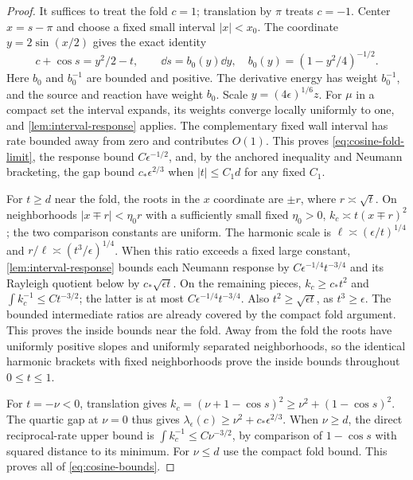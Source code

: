 \begin{proof}
It suffices to treat the fold $c=1$; translation by $\pi$ treats
$c=-1$. Center $x=s-\pi$ and choose a fixed small interval $|x|<x_0$.
The coordinate $y=2\sin(x/2)$ gives the exact identity
\[
 c+\cos s=y^2/2-t,\qquad
 \dd s=b_0(y)\dd y,\quad b_0(y)=(1-y^2/4)^{-1/2}.
\]
Here $b_0$ and $b_0^{-1}$ are bounded and positive. The derivative
energy has weight $b_0^{-1}$, and the source and reaction have weight
$b_0$. Scale $y=(4\epsilon)^{1/6}z$. For $\mu$ in a compact set the
interval expands, its weights converge locally uniformly to one,
and \cref{lem:interval-response} applies. The complementary fixed
wall interval has rate bounded away from zero and contributes $O(1)$.
This proves \eqref{eq:cosine-fold-limit}, the response bound
$C\epsilon^{-1/2}$, and, by the anchored inequality and Neumann
bracketing, the gap bound $c_*\epsilon^{2/3}$ when $|t|\le C_1d$
for any fixed $C_1$.

For $t\ge d$ near the fold, the roots in the $x$ coordinate are
$\pm r$, where $r\asymp\sqrt t$. On neighborhoods
$|x\mp r|<\eta_0r$ with a sufficiently small fixed $\eta_0>0$,
$k_c\asymp t(x\mp r)^2$; the two comparison constants are uniform.
The harmonic scale is $\ell\asymp(\epsilon/t)^{1/4}$ and
$r/\ell\asymp(t^3/\epsilon)^{1/4}$. When this ratio exceeds a fixed
large constant, \cref{lem:interval-response} bounds each Neumann
response by $C\epsilon^{-1/4}t^{-3/4}$ and its Rayleigh quotient below
by $c_*\sqrt{\epsilon t}$. On the remaining pieces,
$k_c\ge c_*t^2$ and $\int k_c^{-1}\le Ct^{-3/2}$;
the latter is at most $C\epsilon^{-1/4}t^{-3/4}$.
Also $t^2\ge\sqrt{\epsilon t}$, as $t^3\ge\epsilon$.
The bounded intermediate ratios are already covered by the compact
fold argument. This proves the inside bounds near the fold.
Away from the fold the roots have uniformly positive slopes and
uniformly separated neighborhoods, so the identical harmonic brackets
with fixed neighborhoods prove the inside bounds throughout $0\le t\le1$.

For $t=-\nu<0$, translation gives
$k_c=(\nu+1-\cos s)^2\ge\nu^2+(1-\cos s)^2$.
The quartic gap at $\nu=0$ thus gives
$\lambda_\epsilon(c)\ge\nu^2+c_*\epsilon^{2/3}$.
When $\nu\ge d$, the direct reciprocal-rate upper bound is
$\int k_c^{-1}\le C\nu^{-3/2}$, by comparison of $1-\cos s$
with squared distance to its minimum. For $\nu\le d$ use the compact
fold bound. This proves all of \eqref{eq:cosine-bounds}.


\end{proof}
